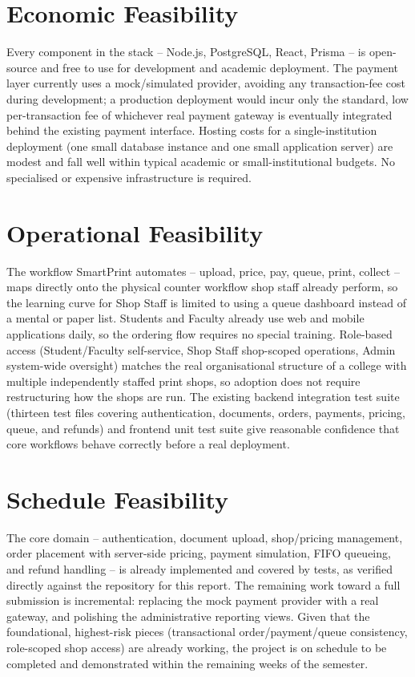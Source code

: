 \documentclass[12pt,a4paper]{report}
\begin{document}
\section{Economic Feasibility}
Every component in the stack -- Node.js, PostgreSQL, React, Prisma -- is open-source and free to use for development and academic deployment. The payment layer currently uses a mock/simulated provider, avoiding any transaction-fee cost during development; a production deployment would incur only the standard, low per-transaction fee of whichever real payment gateway is eventually integrated behind the existing payment interface. Hosting costs for a single-institution deployment (one small database instance and one small application server) are modest and fall well within typical academic or small-institutional budgets. No specialised or expensive infrastructure is required.

\section{Operational Feasibility}
The workflow SmartPrint automates -- upload, price, pay, queue, print, collect -- maps directly onto the physical counter workflow shop staff already perform, so the learning curve for Shop Staff is limited to using a queue dashboard instead of a mental or paper list. Students and Faculty already use web and mobile applications daily, so the ordering flow requires no special training. Role-based access (Student/Faculty self-service, Shop Staff shop-scoped operations, Admin system-wide oversight) matches the real organisational structure of a college with multiple independently staffed print shops, so adoption does not require restructuring how the shops are run. The existing backend integration test suite (thirteen test files covering authentication, documents, orders, payments, pricing, queue, and refunds) and frontend unit test suite give reasonable confidence that core workflows behave correctly before a real deployment.

\section{Schedule Feasibility}
The core domain -- authentication, document upload, shop/pricing management, order placement with server-side pricing, payment simulation, FIFO queueing, and refund handling -- is already implemented and covered by tests, as verified directly against the repository for this report. The remaining work toward a full submission is incremental: replacing the mock payment provider with a real gateway, and polishing the administrative reporting views. Given that the foundational, highest-risk pieces (transactional order/payment/queue consistency, role-scoped shop access) are already working, the project is on schedule to be completed and demonstrated within the remaining weeks of the semester.
\end{document}
